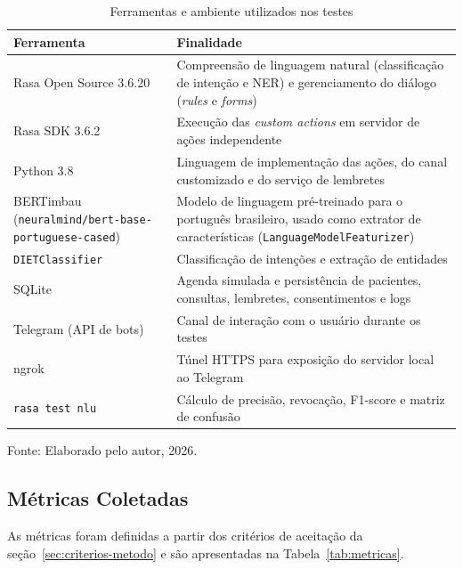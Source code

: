 \documentclass[12pt,a4paper]{extarticle}
\begin{document}
\begin{table}[H]
\centering
\caption{Ferramentas e ambiente utilizados nos testes}
\label{tab:ferramentas}
\begin{tabular}{p{4.2cm}p{9cm}}
\hline
\textbf{Ferramenta} & \textbf{Finalidade} \\
\hline
Rasa Open Source 3.6.20 & Compreensão de linguagem natural (classificação de intenção e NER) e gerenciamento do diálogo (\textit{rules} e \textit{forms}) \\
Rasa SDK 3.6.2 & Execução das \textit{custom actions} em servidor de ações independente \\
Python 3.8 & Linguagem de implementação das ações, do canal customizado e do serviço de lembretes \\
BERTimbau (\texttt{neuralmind/\allowbreak bert-base-\allowbreak portuguese-cased}) & Modelo de linguagem pré-treinado para o português brasileiro, usado como extrator de características (\texttt{LanguageModel\allowbreak{}Featurizer}) \\
\texttt{DIETClassifier} & Classificação de intenções e extração de entidades \\
SQLite & Agenda simulada e persistência de pacientes, consultas, lembretes, consentimentos e logs \\
Telegram (API de bots) & Canal de interação com o usuário durante os testes \\
ngrok & Túnel HTTPS para exposição do servidor local ao Telegram \\
\texttt{rasa test nlu} & Cálculo de precisão, revocação, F1-score e matriz de confusão \\
\hline
\end{tabular}
\vspace{0.3cm}

\footnotesize{Fonte: Elaborado pelo autor, 2026.}
\end{table}

\subsection{Métricas Coletadas}
\label{sec:metricas}

As métricas foram definidas a partir dos critérios de aceitação da seção~\ref{sec:criterios-metodo} e são apresentadas na Tabela~\ref{tab:metricas}.
\end{document}
